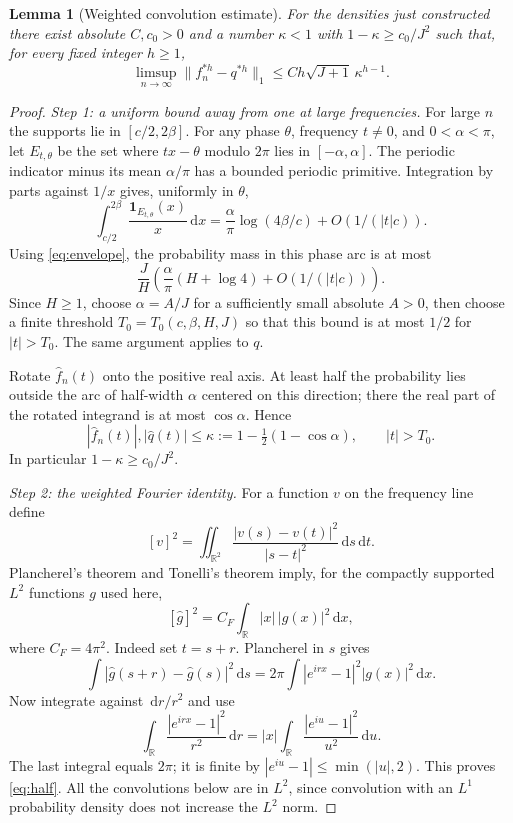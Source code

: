 \documentclass[11pt]{article}
\newtheorem{lemma}[theorem]{Lemma}
\theoremstyle{remark}\newtheorem{remark}[theorem]{Remark}
\newcommand{\ind}{\mathbf 1}
\newcommand{\dd}{\,\mathrm d}
\begin{document}
\begin{lemma}[Weighted convolution estimate]\label{lem:fourier}
For the densities just constructed there exist absolute $C,c_0>0$ and a number $\kappa<1$ with $1-\kappa\ge c_0/J^2$ such that, for every fixed integer $h\ge1$,
\begin{equation}\label{eq:convolution}
 \limsup_{n\to\infty}\|f_n^{*h}-q^{*h}\|_1
 \le C h\sqrt{J+1}\,\kappa^{h-1}.
\end{equation}
\end{lemma}
\begin{proof}
\emph{Step 1: a uniform bound away from one at large frequencies.}
For large $n$ the supports lie in $[c/2,2\beta]$. For any phase $\theta$, frequency $t\ne0$, and $0<\alpha<\pi$, let $E_{t,\theta}$ be the set where $tx-\theta$ modulo $2\pi$ lies in $[-\alpha,\alpha]$. The periodic indicator minus its mean $\alpha/\pi$ has a bounded periodic primitive. Integration by parts against $1/x$ gives, uniformly in $\theta$,
\[
 \int_{c/2}^{2\beta}\frac{\ind_{E_{t,\theta}}(x)}x\dd x
 =\frac\alpha\pi\log(4\beta/c)+O(1/(|t|c)).
\]
Using \eqref{eq:envelope}, the probability mass in this phase arc is at most
\[
 \frac JH\left(\frac\alpha\pi(H+\log4)+O(1/(|t|c))\right).
\]
Since $H\ge1$, choose $\alpha=A/J$ for a sufficiently small absolute $A>0$, then choose a finite threshold $T_0=T_0(c,\beta,H,J)$ so that this bound is at most $1/2$ for $|t|>T_0$. The same argument applies to $q$.

Rotate $\widehat f_n(t)$ onto the positive real axis. At least half the probability lies outside the arc of half-width $\alpha$ centered on this direction; there the real part of the rotated integrand is at most $\cos\alpha$. Hence
\begin{equation}\label{eq:gap}
 |\widehat f_n(t)|,|\widehat q(t)|\le
 \kappa:=1-\tfrac12(1-\cos\alpha),\qquad |t|>T_0.
\end{equation}
In particular $1-\kappa\ge c_0/J^2$.

\emph{Step 2: the weighted Fourier identity.}
For a function $v$ on the frequency line define
\[
 [v]^2=\iint_{\mathbb R^2}\frac{|v(s)-v(t)|^2}{|s-t|^2}\dd s\dd t.
\]
Plancherel's theorem and Tonelli's theorem imply, for the compactly supported $L^2$ functions $g$ used here,
\begin{equation}\label{eq:half}
 [\widehat g]^2=C_F\int_{\mathbb R}|x|\,|g(x)|^2\dd x,
\end{equation}
where $C_F=4\pi^2$. Indeed set $t=s+r$. Plancherel in $s$ gives
\[
 \int|\widehat g(s+r)-\widehat g(s)|^2\dd s
 =2\pi\int|e^{irx}-1|^2|g(x)|^2\dd x.
\]
Now integrate against $\dd r/r^2$ and use
\[
 \int_{\mathbb R}\frac{|e^{irx}-1|^2}{r^2}\dd r
 =|x|\int_{\mathbb R}\frac{|e^{iu}-1|^2}{u^2}\dd u.
\]
The last integral equals $2\pi$; it is finite by $|e^{iu}-1|\le\min(|u|,2)$. This proves \eqref{eq:half}. All the convolutions below are in $L^2$, since convolution with an $L^1$ probability density does not increase the $L^2$ norm.


\end{proof}
\end{document}
